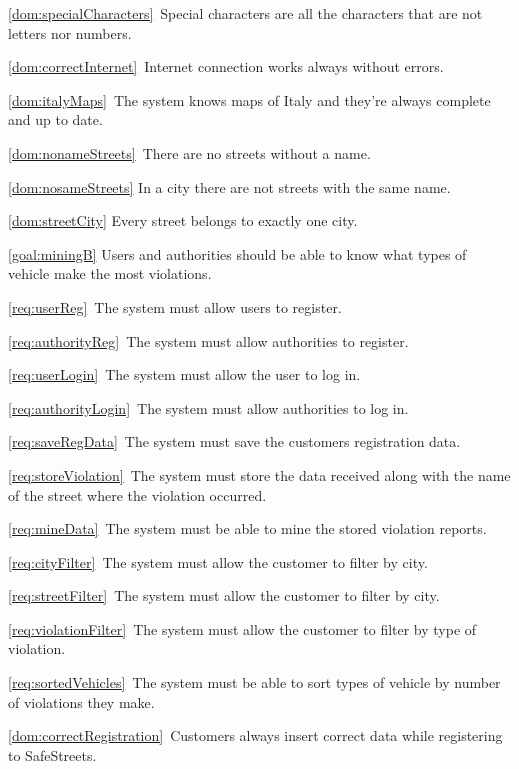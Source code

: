 \begin{description}
\begin{description}
\begin{description}
							\item \ref{dom:specialCharacters}\ Special characters are all the characters that are not letters nor numbers.
							\item \ref{dom:correctInternet}\ Internet connection works always without errors.
							\item \ref{dom:italyMaps}\ The system knows maps of Italy and they’re always complete and up to date.
							\item \ref{dom:nonameStreets}\ There are no streets without a name.
							\item \ref{dom:nosameStreets} In a city there are not streets with the same name.
							\item \ref{dom:streetCity} Every street belongs to exactly one city.
						\end{description}
					\item \ref{goal:miningB} Users and authorities should be able to know what types of vehicle make the most violations.
						\begin{description}
							\item \ref{req:userReg}\ The system must allow users to register.
							\item \ref{req:authorityReg}\ The system must allow authorities to register.
							\item \ref{req:userLogin}\ The system must allow the user to log in.
							\item \ref{req:authorityLogin}\ The system must allow authorities to log in.
							\item \ref{req:saveRegData}\ The system must save the customers registration data.
							\item \ref{req:storeViolation}\ The system must store the data received along with the name of the street where the violation occurred.
							\item \ref{req:mineData}\ The system must be able to mine the stored violation reports.
							\item \ref{req:cityFilter}\ The system must allow the customer to filter by city.
							\item \ref{req:streetFilter}\ The system must allow the customer to filter by city.
							\item \ref{req:violationFilter}\ The system must allow the customer to filter by type of violation.
							\item \ref{req:sortedVehicles}\ The system must be able to sort types of vehicle by number of violations they make.
							\item \ref{dom:correctRegistration}\ Customers always insert correct data while registering to SafeStreets.

\end{description}
\end{description}
\end{description}
